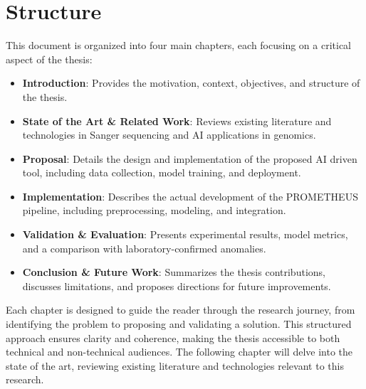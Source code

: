 \section{Structure}
\label{sec:Structure}

This document is organized into four main chapters, each focusing on a critical aspect of the thesis:

\begin{itemize}
\item \textbf{Introduction}: Provides the motivation, context, objectives, and structure of the thesis.
\item \textbf{State of the Art \& Related Work}: Reviews existing literature and technologies in Sanger sequencing and AI applications in genomics.
\item \textbf{Proposal}: Details the design and implementation of the proposed AI driven tool, including data collection, model training, and deployment.
\item \textbf{Implementation}: Describes the actual development of the PROMETHEUS pipeline, including preprocessing, modeling, and integration.
\item \textbf{Validation \& Evaluation}: Presents experimental results, model metrics, and a comparison with laboratory-confirmed anomalies.
\item \textbf{Conclusion \& Future Work}: Summarizes the thesis contributions, discusses limitations, and proposes directions for future improvements.
\end{itemize}

Each chapter is designed to guide the reader through the research journey, from identifying the problem to proposing and validating a solution. This structured approach ensures clarity and coherence, making the thesis accessible to both technical and non-technical audiences.
The following chapter will delve into the state of the art, reviewing existing literature and technologies relevant to this research.
